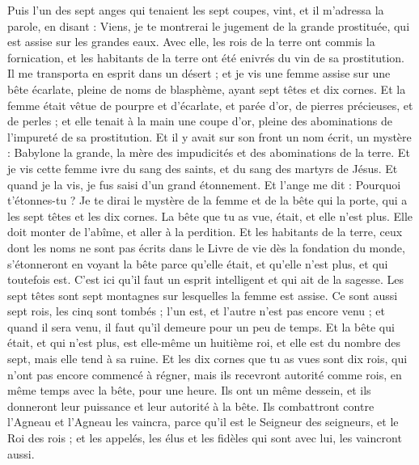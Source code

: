 \begin{multicols}{2}
\VerseOne{}Puis l'un des sept anges qui tenaient les sept coupes, vint, et il m'adressa la parole, en disant : Viens, je te montrerai le jugement de la grande prostituée, qui est assise sur les grandes eaux.
Avec elle, les rois de la terre ont commis la fornication, et les habitants de la terre ont été enivrés du vin de sa prostitution.
Il me transporta en esprit dans un désert ; et je vis une femme assise sur une bête écarlate, pleine de noms de blasphème, ayant sept têtes et dix cornes.
Et la femme était vêtue de pourpre et d'écarlate, et parée d'or, de pierres précieuses, et de perles ; et elle tenait à la main une coupe d'or, pleine des abominations de l'impureté de sa prostitution.
Et il y avait sur son front un nom écrit, un mystère : Babylone la grande, la mère des impudicités et des abominations de la terre.
Et je vis cette femme ivre du sang des saints, et du sang des martyrs de Jésus. Et quand je la vis, je fus saisi d'un grand étonnement.
Et l'ange me dit : Pourquoi t'étonnes-tu ? Je te dirai le mystère de la femme et de la bête qui la porte, qui a les sept têtes et les dix cornes.
La bête que tu as vue, était, et elle n'est plus. Elle doit monter de l'abîme, et aller à la perdition. Et les habitants de la terre, ceux dont les noms ne sont pas écrits dans le Livre de vie dès la fondation du monde, s'étonneront en voyant la bête parce qu'elle était, et qu'elle n'est plus, et qui toutefois est.
C'est ici qu'il faut un esprit intelligent et qui ait de la sagesse. Les sept têtes sont sept montagnes sur lesquelles la femme est assise.
Ce sont aussi sept rois, les cinq sont tombés ; l'un est, et l'autre n'est pas encore venu ; et quand il sera venu, il faut qu'il demeure pour un peu de temps.
Et la bête qui était, et qui n'est plus, est elle-même un huitième roi, et elle est du nombre des sept, mais elle tend à sa ruine.
Et les dix cornes que tu as vues sont dix rois, qui n'ont pas encore commencé à régner, mais ils recevront autorité comme rois, en même temps avec la bête, pour une heure.
Ils ont un même dessein, et ils donneront leur puissance et leur autorité à la bête.
Ils combattront contre l'Agneau et l'Agneau les vaincra, parce qu'il est le Seigneur des seigneurs, et le Roi des rois ; et les appelés, les élus et les fidèles qui sont avec lui, les vaincront aussi.

\end{multicols}
